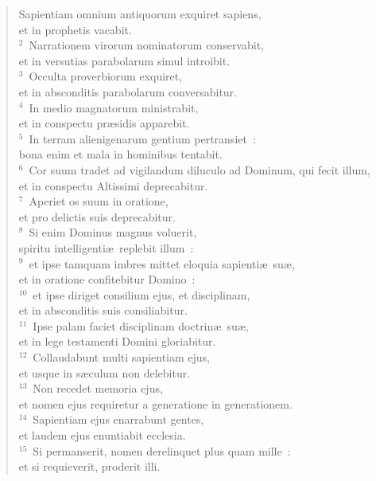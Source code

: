 \begin{flushleft}\begin{verse}\vspace{-19pt}\hspace{6pt}Sapientiam omnium antiquorum exquiret sapiens,\\\hspace{6pt} et in prophetis vacabit.\\
${}^{2}$~Narrationem virorum nominatorum conservabit,\\ et in versutias parabolarum simul introibit.\\
${}^{3}$~Occulta proverbiorum exquiret,\\ et in absconditis parabolarum conversabitur.\\
${}^{4}$~In medio magnatorum ministrabit,\\ et in conspectu pr\ae sidis apparebit.\\
${}^{5}$~In terram alienigenarum gentium pertransiet~:\\ bona enim et mala in hominibus tentabit.\\
${}^{6}$~Cor suum tradet ad vigilandum diluculo ad Dominum, qui fecit illum,\\ et in conspectu Altissimi deprecabitur.\\
${}^{7}$~Aperiet os suum in oratione,\\ et pro delictis suis deprecabitur.\\
${}^{8}$~Si enim Dominus magnus voluerit,\\ spiritu intelligenti\ae\ replebit illum~:\\
${}^{9}$~et ipse tamquam imbres mittet eloquia sapienti\ae\ su\ae ,\\ et in oratione confitebitur Domino~:\\
${}^{10}$~et ipse diriget consilium ejus, et disciplinam,\\ et in absconditis suis consiliabitur.\\
${}^{11}$~Ipse palam faciet disciplinam doctrin\ae\ su\ae ,\\ et in lege testamenti Domini gloriabitur.\\
${}^{12}$~Collaudabunt multi sapientiam ejus,\\ et usque in s\ae culum non delebitur.\\
${}^{13}$~Non recedet memoria ejus,\\ et nomen ejus requiretur a generatione in generationem.\\
${}^{14}$~Sapientiam ejus enarrabunt gentes,\\ et laudem ejus enuntiabit ecclesia.\\
${}^{15}$~Si permanserit, nomen derelinquet plus quam mille~:\\ et si requieverit, proderit illi.\end{verse}\end{flushleft}


